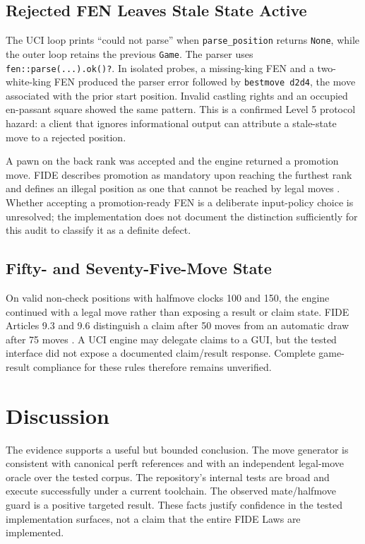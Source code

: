 \documentclass[conference]{IEEEtran}
\begin{document}
\subsection{Rejected FEN Leaves Stale State Active}
The UCI loop prints ``could not parse'' when \texttt{parse\_position} returns \texttt{None}, while the outer loop retains the previous \texttt{Game}. The parser uses \texttt{fen::parse(...).ok()?}. In isolated probes, a missing-king FEN and a two-white-king FEN produced the parser error followed by \texttt{bestmove d2d4}, the move associated with the prior start position. Invalid castling rights and an occupied en-passant square showed the same pattern. This is a confirmed Level 5 protocol hazard: a client that ignores informational output can attribute a stale-state move to a rejected position.

A pawn on the back rank was accepted and the engine returned a promotion move. FIDE describes promotion as mandatory upon reaching the furthest rank and defines an illegal position as one that cannot be reached by legal moves \cite{fide}. Whether accepting a promotion-ready FEN is a deliberate input-policy choice is unresolved; the implementation does not document the distinction sufficiently for this audit to classify it as a definite defect.

\subsection{Fifty- and Seventy-Five-Move State}
On valid non-check positions with halfmove clocks 100 and 150, the engine continued with a legal move rather than exposing a result or claim state. FIDE Articles 9.3 and 9.6 distinguish a claim after 50 moves from an automatic draw after 75 moves \cite{fide}. A UCI engine may delegate claims to a GUI, but the tested interface did not expose a documented claim/result response. Complete game-result compliance for these rules therefore remains unverified.

\section{Discussion}
The evidence supports a useful but bounded conclusion. The move generator is consistent with canonical perft references and with an independent legal-move oracle over the tested corpus. The repository's internal tests are broad and execute successfully under a current toolchain. The observed mate/halfmove guard is a positive targeted result. These facts justify confidence in the tested implementation surfaces, not a claim that the entire FIDE Laws are implemented.
\end{document}

